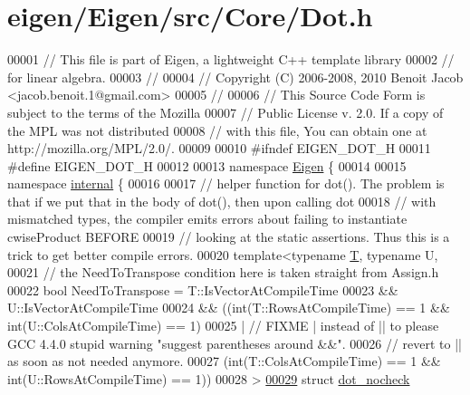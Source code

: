 \hypertarget{eigen_2_eigen_2src_2_core_2_dot_8h_source}{}\section{eigen/\+Eigen/src/\+Core/\+Dot.h}
\label{eigen_2_eigen_2src_2_core_2_dot_8h_source}

\begin{DoxyCode}
00001 \textcolor{comment}{// This file is part of Eigen, a lightweight C++ template library}
00002 \textcolor{comment}{// for linear algebra.}
00003 \textcolor{comment}{//}
00004 \textcolor{comment}{// Copyright (C) 2006-2008, 2010 Benoit Jacob <jacob.benoit.1@gmail.com>}
00005 \textcolor{comment}{//}
00006 \textcolor{comment}{// This Source Code Form is subject to the terms of the Mozilla}
00007 \textcolor{comment}{// Public License v. 2.0. If a copy of the MPL was not distributed}
00008 \textcolor{comment}{// with this file, You can obtain one at http://mozilla.org/MPL/2.0/.}
00009 
00010 \textcolor{preprocessor}{#ifndef EIGEN\_DOT\_H}
00011 \textcolor{preprocessor}{#define EIGEN\_DOT\_H}
00012 
00013 \textcolor{keyword}{namespace }\hyperlink{namespace_eigen}{Eigen} \{ 
00014 
00015 \textcolor{keyword}{namespace }\hyperlink{namespaceinternal}{internal} \{
00016 
00017 \textcolor{comment}{// helper function for dot(). The problem is that if we put that in the body of dot(), then upon calling
       dot}
00018 \textcolor{comment}{// with mismatched types, the compiler emits errors about failing to instantiate cwiseProduct BEFORE}
00019 \textcolor{comment}{// looking at the static assertions. Thus this is a trick to get better compile errors.}
00020 \textcolor{keyword}{template}<\textcolor{keyword}{typename} \hyperlink{group___sparse_core___module_class_eigen_1_1_triplet}{T}, \textcolor{keyword}{typename} U,
00021 \textcolor{comment}{// the NeedToTranspose condition here is taken straight from Assign.h}
00022          \textcolor{keywordtype}{bool} NeedToTranspose = T::IsVectorAtCompileTime
00023                 && U::IsVectorAtCompileTime
00024                 && ((int(T::RowsAtCompileTime) == 1 && int(U::ColsAtCompileTime) == 1)
00025                       |  \textcolor{comment}{// FIXME | instead of || to please GCC 4.4.0 stupid warning "suggest parentheses
       around &&".}
00026                          \textcolor{comment}{// revert to || as soon as not needed anymore.}
00027                     (\textcolor{keywordtype}{int}(T::ColsAtCompileTime) == 1 && int(U::RowsAtCompileTime) == 1))
00028 >
\hyperlink{struct_eigen_1_1internal_1_1dot__nocheck}{00029} \textcolor{keyword}{struct }\hyperlink{struct_eigen_1_1internal_1_1dot__nocheck}{dot\_nocheck}

\end{DoxyCode}
